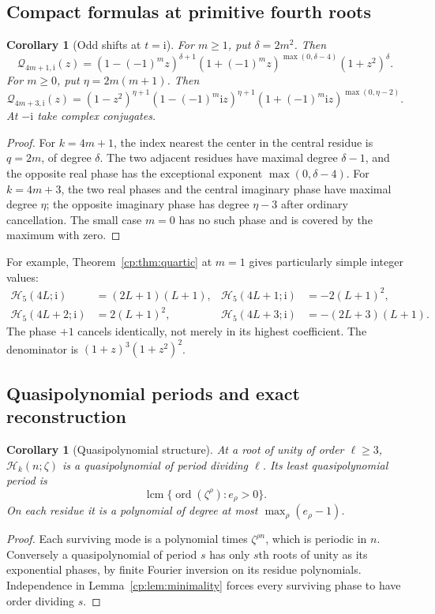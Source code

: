 \documentclass[11pt]{article}
\newtheorem{corollary}[theorem]{Corollary}
\theoremstyle{definition}
\theoremstyle{remark}
\newcommand{\Ht}{\mathcal H}
\newcommand{\ord}{\operatorname{ord}}
\newcommand{\QQ}{\mathscr Q}
\newcommand{\ii}{\mathrm i}
\theoremstyle{definition}
\theoremstyle{plain}
\numberwithin{equation}{section}
\begin{document}
\subsection{Compact formulas at primitive fourth roots}
\begin{corollary}[Odd shifts at $t=\ii$]
\label{cp:cor:fourth}
For $m\ge1$, put $\delta=2m^2$. Then
\begin{equation}
 \QQ_{4m+1,\ii}(z)=
 (1-(-1)^m z)^{\delta+1}
 (1+(-1)^m z)^{\max(0,\delta-4)}
 (1+z^2)^\delta.
 \label{cp:eq:fourth1}
\end{equation}
For $m\ge0$, put $\eta=2m(m+1)$. Then
\begin{equation}
 \QQ_{4m+3,\ii}(z)=
 (1-z^2)^{\eta+1}
 (1-(-1)^m\ii z)^{\eta+1}
 (1+(-1)^m\ii z)^{\max(0,\eta-2)}.
 \label{cp:eq:fourth3}
\end{equation}
At $-\ii$ take complex conjugates.
\end{corollary}
\begin{proof}
For $k=4m+1$, the index nearest the center in the central residue is
$q=2m$, of degree $\delta$. The two adjacent residues have maximal degree
$\delta-1$, and the opposite real phase has the exceptional exponent
$\max(0,\delta-4)$.
For $k=4m+3$, the two real phases and the central imaginary phase have
maximal degree $\eta$; the opposite imaginary phase has degree
$\eta-3$ after ordinary cancellation. The small case $m=0$ has no such
phase and is covered by the maximum with zero.
\end{proof}

For example, Theorem~\ref{cp:thm:quartic} at $m=1$ gives particularly simple
integer values:
\begin{align*}
 \Ht_5(4L;\ii)&=(2L+1)(L+1),&
 \Ht_5(4L+1;\ii)&=-2(L+1)^2,\\
 \Ht_5(4L+2;\ii)&=2(L+1)^2,&
 \Ht_5(4L+3;\ii)&=-(2L+3)(L+1).
\end{align*}
The phase $+1$ cancels identically, not merely in its highest coefficient.
The denominator is $(1+z)^3(1+z^2)^2$.

\subsection{Quasipolynomial periods and exact reconstruction}
\begin{corollary}[Quasipolynomial structure]
\label{cp:cor:quasipolynomial}
At a root of unity of order $\ell\ge3$, $\Ht_k(n;\zeta)$ is a
quasipolynomial of period dividing $\ell$. Its least quasipolynomial
period is
\begin{equation}
 \operatorname{lcm}\{\ord(\zeta^\rho):e_\rho>0\}.
 \label{cp:eq:leastperiod}
\end{equation}
On each residue it is a polynomial of degree at most
$\max_\rho(e_\rho-1)$.
\end{corollary}
\begin{proof}
Each surviving mode is a polynomial times $\zeta^{\rho n}$, which is
periodic in $n$. Conversely a quasipolynomial of period $s$ has only
$s$th roots of unity as its exponential phases, by finite Fourier inversion
on its residue polynomials. Independence in Lemma~\ref{cp:lem:minimality}
forces every surviving phase to have order dividing $s$.
\end{proof}
\end{document}
